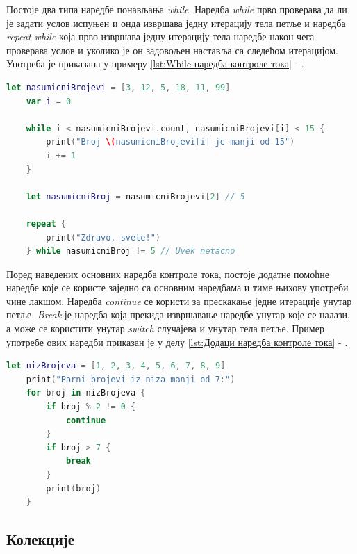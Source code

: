 \documentclass[12pt,oneside]{memoir}
\begin{document}
\indent Постоје два типа наредбе понављања \textit{while}. Наредба \textit{while} прво проверава да ли је задати услов испуњен и онда извршава једну итерацију тела петље и наредба \textit{repeat-while} која прво извршава једну итерацију тела наредбе након чега проверава услов и уколико је он задовољен наставља са следећом итерацијом. Употреба је приказана у примеру \ref{lst:While наредба контроле тока} - . 

\begin{lstlisting}[caption=\textit{{While наредбa контроле тока}}, label={lst:While наредба контроле тока}, language=Swift, frame=single]
    let nasumicniBrojevi = [3, 12, 5, 18, 11, 99]
    var i = 0
    
    while i < nasumicniBrojevi.count, nasumicniBrojevi[i] < 15 {
        print("Broj \(nasumicniBrojevi[i] je manji od 15")
        i += 1
    }
    
    let nasumicniBroj = nasumicniBrojevi[2] // 5
    
    repeat {
        print("Zdravo, svete!")
    } while nasumicniBroj != 5 // Uvek netacno
\end{lstlisting}

\indent Поред наведених основних наредба контроле тока, постоје додатне помоћне наредбе које се користе заједно са основним наредбама и тиме њихову употреби чине лакшом. Наредба \textit{continue} се користи за прескакање једне итерације унутар петље. \textit{Break} је наредба која прекида извршавање наредбе унутар које се налази, а може се користити унутар \textit{switch} случајева и унутар тела петље. Пример употребе ових наредби приказан је у делу \ref{lst:Додаци наредба контроле тока} - .

\begin{lstlisting}[caption=\textit{{Додаци наредбa контроле тока}}, label={lst:Додаци наредба контроле тока}, language=Swift, frame=single]
    let nizBrojeva = [1, 2, 3, 4, 5, 6, 7, 8, 9]
    print("Parni brojevi iz niza manji od 7:")
    for broj in nizBrojeva {
        if broj % 2 != 0 {
            continue
        }
        if broj > 7 {
            break
        }
        print(broj)
    }
\end{lstlisting}

\subsection{Колекције}
\label{subsec:Колекције}
\end{document}
